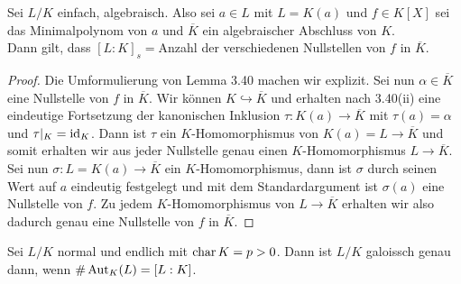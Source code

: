 \documentclass{scrartcl}
\begin{document}
    \begin{lemma}
        Sei $L/K$ einfach, algebraisch. Also sei $a\in L$ mit $L=K(a)$ und $f\in K[X]$ sei das Minimalpolynom von $a$ und $\overline{K}$ ein algebraischer Abschluss von $K$. \\ Dann gilt, dass $[L:K]_s=$Anzahl der verschiedenen Nullstellen von $f$ in $\overline{K}$.
    \end{lemma}
    \begin{proof}
        Die \glqq Umformulierung von Lemma 3.40\grqq{} machen wir explizit. Sei nun $\alpha\in \overline{K}$ eine Nullstelle von $f$ in $\overline{K}$. Wir können $K\hookrightarrow \overline{K}$ und erhalten nach 3.40(ii) eine eindeutige Fortsetzung der kanonischen Inklusion $\tau:K(a)\to\overline{K}$ mit $\tau(a)=\alpha$ und $\tau|_{K}=\operatorname{id}_K$. Dann ist $\tau$ ein $K$-Homomorphismus von $K(a)=L\to \overline{K}$ und somit erhalten wir aus jeder Nullstelle genau einen $K$-Homomorphismus $L\to \overline{K}$. \\
        Sei nun $\sigma:L=K(a)\to \overline{K}$ ein $K$-Homomorphismus, dann ist $\sigma$ durch seinen Wert auf $a$ eindeutig festgelegt und mit dem Standardargument ist $\sigma(a)$ eine Nullstelle von $f$. Zu jedem $K$-Homomorphismus von $L\to \overline{K}$ erhalten wir also dadurch genau eine Nullstelle von $f$ in $\overline{K}$.   
    \end{proof}
    \begin{prop}
        Sei $L/K$ normal und endlich mit $\operatorname{char} K=p>0$. Dann ist $L/K$ galoissch genau dann, wenn $\#\operatorname{Aut}_K(L)=[L:K]$.
    \end{prop}
\end{document}
